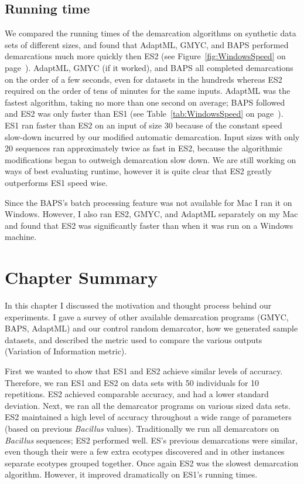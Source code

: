 \subsection*{Running time}
We compared the running times of the demarcation algorithms on synthetic data sets of different sizes, and found that AdaptML, GMYC, and BAPS performed demarcations much more quickly then ES2 (see Figure~\ref{fig:WindowsSpeed} on page~\pageref{fig:WindowsSpeed}).
AdaptML, GMYC (if it worked), and BAPS all completed demarcations on the order of a few seconds, even for datasets in the hundreds whereas ES2 required on the order of tens of minutes for the same inputs.
AdaptML was the fastest algorithm, taking no more than one second on average; BAPS followed and ES2 was only faster than ES1 (see Table~\ref{tab:WindowsSpeed} on page~\pageref{tab:WindowsSpeed}).
ES1 ran faster than ES2 on an input of size 30 because of the constant speed slow-down incurred by our modified automatic demarcation.
Input sizes with only 20 sequences ran approximately twice as fast in ES2, because the algorithmic modifications began to outweigh demarcation slow down.
We are still working on ways of best evaluating runtime, however it is quite clear that ES2 greatly outperforms ES1 speed wise.

Since the BAPS's batch processing feature was not available for Mac I ran it on Windows.
However, I also ran ES2, GMYC, and AdaptML separately on my Mac and found that ES2 was significantly faster than when it was run on a Windows machine.

\section{Chapter Summary}
In this chapter I discussed the motivation and thought process behind our experiments.
I gave a survey of other available demarcation programs (GMYC, BAPS, AdaptML) and our control random demarcator, how we generated sample datasets, and described the metric used to compare the various outputs (Variation of Information metric).

First we wanted to show that ES1 and ES2 achieve similar levels of accuracy.
Therefore, we ran ES1 and ES2 on data sets with 50 individuals for 10 repetitions.
ES2 achieved comparable accuracy, and had a lower standard deviation.
Next, we ran all the demarcator programs on various sized data sets.
ES2 maintained a high level of accuracy throughout a wide range of parameters (based on previous \emph{Bacillus} values).
Traditionally we run all demarcators on \emph{Bacillus} sequences; ES2 performed well.
ES's previous demarcations were similar, even though their were a few extra ecotypes discovered and in other instances separate ecotypes grouped together.
Once again ES2 was the slowest demarcation algorithm.
However, it improved dramatically on ES1's running times.


